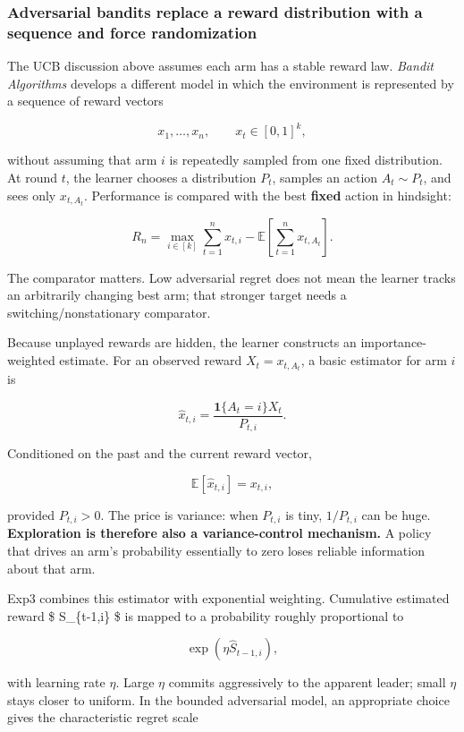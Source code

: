 \subsubsection{Adversarial bandits replace a reward distribution with a sequence and force randomization}\label{adversarial-bandits-replace-a-reward-distribution-with-a-sequence-and-force-randomization}

The UCB discussion above assumes each arm has a stable reward law. \emph{Bandit Algorithms} develops a different model in which the environment is represented by a sequence of reward vectors

\[
x_1,\ldots,x_n,\qquad x_t\in[0,1]^k,
\]

without assuming that arm \(i\) is repeatedly sampled from one fixed distribution. At round \(t\), the learner chooses a distribution \(P_t\), samples an action \(A_t\sim P_t\), and sees only \(x_{t,A_t}\). Performance is compared with the best \textbf{fixed} action in hindsight:

\[
R_n
=
\max_{i\in[k]}
\sum_{t=1}^{n}x_{t,i}
-
\mathbb E\!\left[
\sum_{t=1}^{n}x_{t,A_t}
\right].
\]

The comparator matters. Low adversarial regret does not mean the learner tracks an arbitrarily changing best arm; that stronger target needs a switching/nonstationary comparator.

Because unplayed rewards are hidden, the learner constructs an importance-weighted estimate. For an observed reward \(X_t=x_{t,A_t}\), a basic estimator for arm \(i\) is

\[
\hat x_{t,i}
=
\frac{\mathbf 1\{A_t=i\}X_t}{P_{t,i}}.
\]

Conditioned on the past and the current reward vector,

\[
\mathbb E[\hat x_{t,i}]
=
x_{t,i},
\]

provided \(P_{t,i}>0\). The price is variance: when \(P_{t,i}\) is tiny, \(1/P_{t,i}\) can be huge. \textbf{Exploration is therefore also a variance-control mechanism.} A policy that drives an arm's probability essentially to zero loses reliable information about that arm.

Exp3 combines this estimator with exponential weighting. Cumulative estimated reward \$ \hat S\_\{t-1,i\} \$ is mapped to a probability roughly proportional to

\[
\exp(\eta\hat S_{t-1,i}),
\]

with learning rate \(\eta\). Large \(\eta\) commits aggressively to the apparent leader; small \(\eta\) stays closer to uniform. In the bounded adversarial model, an appropriate choice gives the characteristic regret scale

